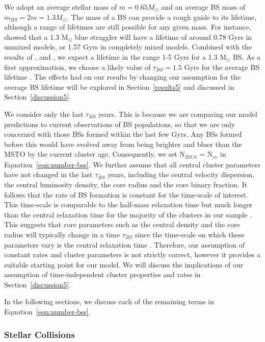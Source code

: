 We adopt an average stellar mass of $m = 0.65 M_{\odot}$ and an
average BS mass of $m_{BS} = 2m = 1.3 M_{\odot}$.  The mass of a BS
can provide a rough guide to its lifetime, although a range of
lifetimes are still possible for any given mass.  
For instance, \citet{sandquist97} showed that a
1.3 M$_{\odot}$ blue straggler will have a lifetime of around $0.78$
Gyrs in unmixed models, or 1.57 Gyrs in 
completely mixed models.  Combined with the results of \citet{sills01},
\citet{lombardi02} and \citet{glebbeek08}, we expect a lifetime in the
range 1-5 Gyrs for a 1.3 M$_{\odot}$ BS.  As a first approximation, we
choose a likely value of $\tau_{BS} = 1.5$ Gyrs for the average BS
lifetime \citep[e.g.][]{sills01}.  The effects had on our
results by changing our assumption for the average BS lifetime will be
explored in Section~\ref{results5} and discussed in
Section~\ref{discussion5}. 

We consider only the last $\tau_{BS}$ years.  This is because we are
comparing our model predictions to current
observations of BS populations, so that we are only concerned with
those BSs formed within the last few Gyrs.  Any BSs formed before this
would have evolved away from being brighter and bluer than the MSTO by
the current cluster age.  Consequently, we set N$_{BS,0}$ =
N$_{ev}$ in Equation~\ref{eqn:number-bss}.  We further assume that
all central cluster parameters have not changed in the last
$\tau_{BS}$ years, including the central velocity dispersion, the
central luminosity density, the core radius and the core binary
fraction.  It follows that the rate of BS formation is constant for
the time-scale of interest.  This time-scale is
comparable to the half-mass relaxation time but much longer than the
central relaxation time for the majority of the clusters in our sample
\citep{harris96}.  This suggests that core
parameters such as the central density and the core radius will
typically change in a time $\tau_{BS}$ since the time-scale on
which these parameters vary is the central relaxation
time \citep{heggie03}.  Therefore, our assumption of constant rates
and cluster parameters is not strictly correct, however it provides a
suitable starting point for our model.  We will discuss the
implications of our assumption of time-independent cluster properties
and rates in Section~\ref{discussion5}.

In the following sections, we discuss each of the remaining terms in
Equation~\ref{eqn:number-bss}.

\subsubsection{Stellar Collisions} \label{collisions5}

